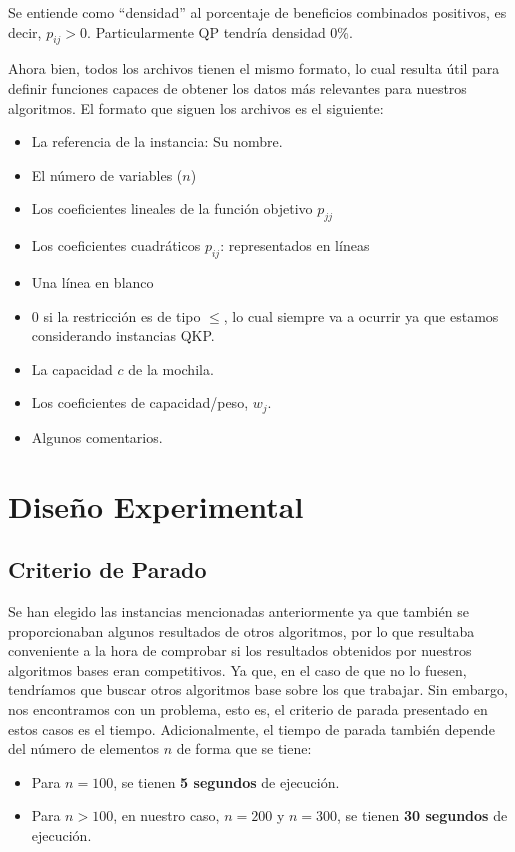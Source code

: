 Se entiende como ``densidad'' al porcentaje de beneficios combinados positivos, es decir, $p_{ij} > 0$. 
Particularmente QP tendría densidad 0\%.

Ahora bien, todos los archivos tienen el mismo formato, lo cual resulta útil para definir funciones capaces de obtener los datos más relevantes para nuestros algoritmos. 
El formato que siguen los archivos es el siguiente:
\begin{itemize}
	\item La referencia de la instancia: Su nombre.
	\item El número de variables ($n$)
	\item Los coeficientes lineales de la función objetivo $p_{jj}$
	\item Los coeficientes cuadráticos $p_{ij}$: representados en líneas
	\item Una línea en blanco
	\item 0 si la restricción es de tipo $\leq$, lo cual siempre va a ocurrir ya que estamos considerando instancias QKP.
	\item La capacidad $c$ de la mochila.
	\item Los coeficientes de capacidad/peso, $w_j$.
	\item Algunos comentarios.
\end{itemize}


\section{Diseño Experimental}

\subsection{Criterio de Parado}

Se han elegido las instancias mencionadas anteriormente ya que también se proporcionaban algunos resultados de otros algoritmos, por lo que resultaba conveniente a la hora de comprobar si los resultados obtenidos por nuestros algoritmos bases eran competitivos. 
Ya que, en el caso de que no lo fuesen, tendríamos que buscar otros algoritmos base sobre los que trabajar.
Sin embargo, nos encontramos con un problema, esto es, el criterio de parada presentado en estos casos es el tiempo.
Adicionalmente, el tiempo de parada también depende del número de elementos $n$ de forma que se tiene:
\begin{itemize}
\item Para $n = 100$, se tienen \textbf{5 segundos} de ejecución.
\item Para $n > 100$, en nuestro caso, $n = 200$ y $n = 300$, se tienen \textbf{30 segundos} de ejecución.
\end{itemize}

